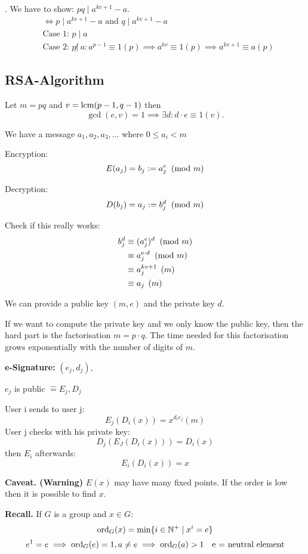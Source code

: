 \Proof.
We have to show: $pq \mid a ^{kv +1} - a$.
\begin{align*}
  &\Leftrightarrow p \mid a ^{kv +1} - a \text{ and } q \mid a ^{kv +1} - a\\
  &\text{Case 1: } p \mid a \\
  &\text{Case 2: } p \not|~ a:
    a^{p-1} \equiv 1 (p) \implies a^{kv} \equiv 1(p) \implies a^{kv+1} \equiv a(p)
\end{align*}

\subsection{RSA-Algorithm}
Let $m = pq$ and $v = \operatorname{lcm}(p-1, q-1)$ then
\[
  \gcd(e,v) = 1 \implies \exists d : d \cdot e \equiv 1 (v).
\]

We have a message $a_1, a_2, a_3, \ldots$ where $0 \leq a_i < m$

Encryption:
\[
  E(a_j) = b_j := a_j^e \imod{m}
\]

Decryption:
\[
  D(b_j) = a_j := b_j^d \imod{m}
\]

Check if this really works:
\begin{align*}
  b_j^d &\equiv (a_j^e)^d \imod{m} \\
    & \equiv a_j^{e \cdot d} \imod{m} \\
    & \equiv a_j^{kv+1} \pod{m} \\
    & \equiv a_j \pod{m} \\
\end{align*}

We can provide a public key $(m,e)$ and the private key $d$.

If we want to compute the private key and we only know the public key, then the hard part is the factorisation $m = p \cdot q$. The time needed for this factorisation grows exponentially with the number of digits of $m$.

\textbf{e-Signature: }
$(e_j,d_j)$,

$e_j$ is public $\hat{=} E_j, D_j$

User i sends to user j:
\[
  E_j(D_i(x)) = x^{d_i e_j} (m)
\]
User j checks with his private key:
\[
  D_j (E_J(D_i(x))) = D_i(x)
\]
then $E_i$ afterwards:
\[
  E_i(D_i(x)) = x
\]

\textbf{Caveat. (Warning)}
$E(x)$ may have many fixed points.
If the order is low then it is possible to find $x$.

\textbf{Recall.}
If $G$ is a group and $x\in G$:
\[
  \operatorname{ord}_G(x) = \min\{ i\in \mathbb{N}^{+} \mid x^i = e \}
\]
\[
  e^1 = e \implies \operatorname{ord}_G(e) = 1, a \neq e \implies \operatorname{ord}_G(a) > 1 \quad \text{e = neutral element}
\]

